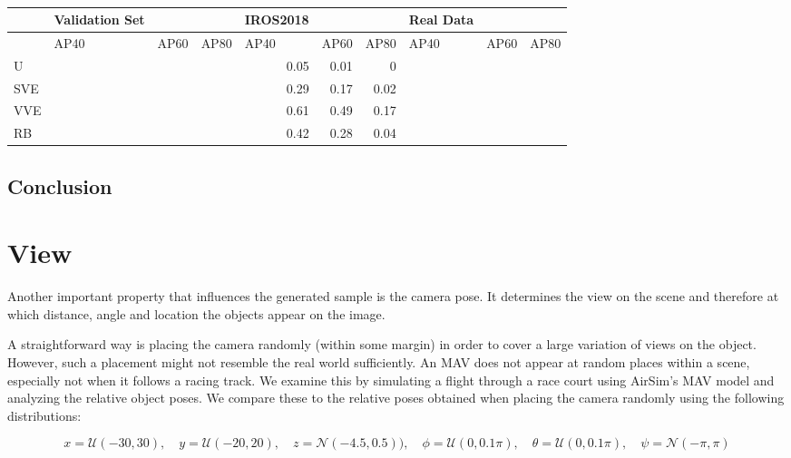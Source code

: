 \begin{table}[htbp]
	\caption{}
	\begin{tabular}{|l|l|l|l|r|r|r|l|l|l|}
		\hline
		& Validation Set &  &  & \multicolumn{1}{l|}{IROS2018} & \multicolumn{1}{l|}{} & \multicolumn{1}{l|}{} & Real Data &  &  \\ \hline
		& AP40 & AP60 & AP80 & \multicolumn{1}{l|}{AP40} & \multicolumn{1}{l|}{AP60} & \multicolumn{1}{l|}{AP80} & AP40 & AP60 & AP80 \\ \hline
		U &  &  &  & 0.05 & 0.01 & 0 &  &  &  \\ \hline
		SVE &  &  &  & 0.29 & 0.17 & 0.02 &  &  &  \\ \hline
		VVE &  &  &  & 0.61 & 0.49 & 0.17 &  &  &  \\ \hline
		RB &  &  &  & 0.42 & 0.28 & 0.04 &  &  &  \\ \hline
	\end{tabular}
	\label{tab:env}
\end{table}

\subsection{Conclusion}

\section{View}

Another important property that influences the generated sample is the camera pose. It determines the view on the scene and therefore at which distance, angle and location the objects appear on the image.

A straightforward way is placing the camera randomly (within some margin) in order to cover a large variation of views on the object. However, such a placement might not resemble the real world sufficiently. An \ac{MAV} does not appear at random places within a scene, especially not when it follows a racing track. We examine this by simulating a flight through a race court using AirSim's \ac{MAV} model and analyzing the relative object poses. We compare these to the relative poses obtained when placing the camera randomly using the following distributions:

\begin{equation}
x = \mathcal{U}(-30,30),\quad y = \mathcal{U}(-20,20),\quad z = \mathcal{N}(-4.5,0.5)),\quad
\phi = \mathcal{U}(0,0.1\pi),\quad \theta = \mathcal{U}(0,0.1\pi),\quad \psi = \mathcal{N}(-\pi,\pi)
\label{eq:distroexp}
\end{equation}

